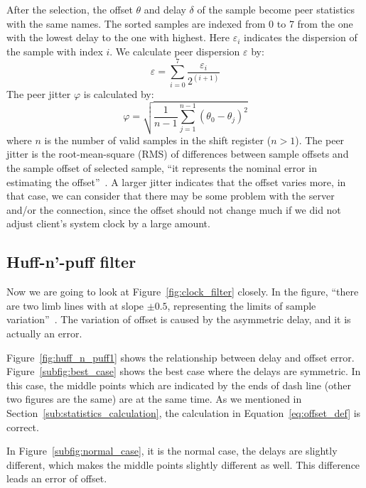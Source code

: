 After the selection, the offset $\theta$ and delay $\delta$ of the sample
become peer statistics with the same names. The sorted samples are indexed from
0 to 7 from the one with the lowest delay to the one with highest. Here
$\varepsilon_i$ indicates the dispersion of the sample with index $i$. We
calculate peer dispersion $\varepsilon$ by:
\begin{equation}
    \varepsilon = \sum^{7}_{i=0} \frac{\varepsilon_i}{2^{(i+1)}}
    \label{eq:peer_dispersion}
\end{equation}
The peer jitter $\varphi$ is calculated by:
\begin{equation}
    \varphi = \sqrt{\frac{1}{n-1} \sum^{n-1}_{j=1} (\theta_0 - \theta_j)^2}
    \label{eq:peer_jitter}
\end{equation}
where $n$ is the number of valid samples in the shift register ($n > 1$).
The peer jitter is the root-mean-square (RMS) of differences between sample
offsets and the sample offset of selected sample, ``it represents the nominal
error in estimating the offset''~\cite{rfc5905}. A larger jitter indicates
that the offset varies more, in that case, we can consider that there may be
some problem with the server and/or the connection, since the offset should not
change much if we did not adjust client's system clock by a large amount.

\subsection{Huff-n'-puff filter}%
\label{sub:huff_n_puff_filter}
Now we are going to look at Figure~\ref{fig:clock_filter} closely. In the
figure, ``there are two limb lines with at slope $\pm0.5$, representing the
limits of sample variation''~\cite{clock_filter}.
The variation of offset is caused by the asymmetric delay, and it is actually
an error.

Figure~\ref{fig:huff_n_puff1} shows the relationship between delay and offset
error.  Figure~\ref{subfig:best_case} shows the best case where the delays are
symmetric. In this case, the middle points which are indicated by the ends of
dash line (other two figures are the same) are at the same time. As we
mentioned in Section~\ref{sub:statistics_calculation}, the calculation in
Equation~\ref{eq:offset_def} is correct. 



In Figure~\ref{subfig:normal_case}, it is the normal case, the delays are
slightly different, which makes the middle points slightly different as well.
This difference leads an error of offset.

